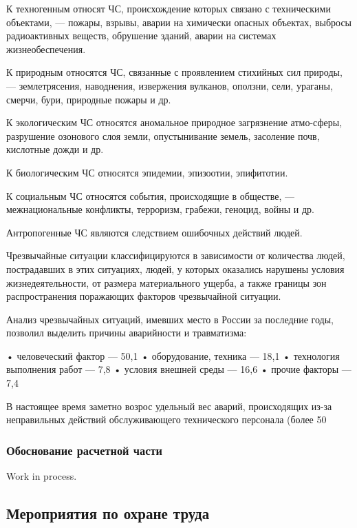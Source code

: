 К техногенным относят ЧС, происхождение которых связано с техническими объектами, — пожары, взрывы, аварии на химически опасных объектах, выбросы радиоактивных веществ, обрушение зданий, аварии на системах жизнеобеспечения.

К природным относятся ЧС, связанные с проявлением стихийных сил природы, — землетрясения, наводнения, извержения вулканов, оползни, сели, ураганы, смерчи, бури, природные пожары и др.

К экологическим ЧС относятся аномальное природное загрязнение атмо-сферы, разрушение озонового слоя земли, опустынивание земель, засоление почв, кислотные дожди и др.

К биологическим ЧС относятся эпидемии, эпизоотии, эпифитотии.

К социальным ЧС относятся события, происходящие в обществе, — межнациональные конфликты, терроризм, грабежи, геноцид, войны и др.

Антропогенные ЧС являются следствием ошибочных действий людей.

Чрезвычайные ситуации классифицируются в зависимости от количества людей, пострадавших в этих ситуациях, людей, у которых оказались нарушены условия жизнедеятельности, от размера материального ущерба, а также границы зон распространения поражающих факторов чрезвычайной ситуации.

Анализ чрезвычайных ситуаций, имевших место в России за последние годы, позволил выделить причины аварийности и травматизма:

•	человеческий фактор — 50,1%
•	оборудование, техника — 18,1%
•	технология выполнения работ — 7,8%
•	условия внешней среды — 16,6%
•	прочие факторы — 7,4%

В настоящее время заметно возрос удельный вес аварий, происходящих из-за неправильных действий обслуживающего технического персонала (более 50%

\subsubsection{Обоснование расчетной части}

Work in process.

\subsection{Мероприятия по охране труда}

